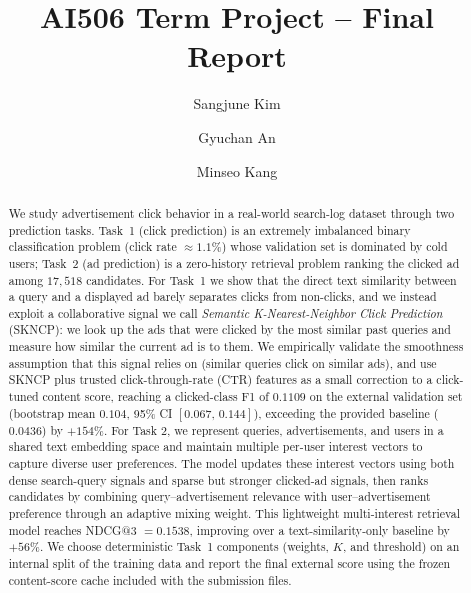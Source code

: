 \documentclass[sigconf, nonacm]{acmart}
\begin{document}
\newcommand{\bit}{\begin{itemize}}
\newcommand{\eit}{\end{itemize}}

\title{AI506 Term Project -- Final Report}

\author{Sangjune Kim}
\author{Gyuchan An}
\author{Minseo Kang}

\begin{abstract}
We study advertisement click behavior in a real-world search-log dataset
through two prediction tasks. Task~1 (click prediction) is an extremely
imbalanced binary classification problem (click rate $\approx 1.1\%$) whose
validation set is dominated by cold users; Task~2 (ad prediction) is a
zero-history retrieval problem ranking the clicked ad among $17{,}518$
candidates. For Task~1 we show that the direct text similarity between a
query and a displayed ad barely separates clicks from non-clicks, and we
instead exploit a collaborative signal we call \emph{Semantic K-Nearest-Neighbor
Click Prediction} (SKNCP): we look up the ads that were clicked by the most
similar past queries and measure how similar the current ad is to them. We
empirically validate the smoothness assumption that this signal relies on
(similar queries click on similar ads), and use SKNCP plus trusted
click-through-rate (CTR) features as a small correction to a click-tuned
content score, reaching a clicked-class F1 of $0.1109$ on the
external validation set (bootstrap mean $0.104$, 95\% CI $[0.067,\,0.144]$),
exceeding the provided baseline ($0.0436$) by $+154\%$. 
For Task 2, we represent queries, advertisements, and users in a shared text embedding space and maintain multiple per-user interest vectors to capture diverse user preferences. The model updates these interest vectors using both dense search-query signals and sparse but stronger clicked-ad signals, then ranks candidates by combining query–advertisement relevance with user–advertisement preference through an adaptive mixing weight.
This lightweight multi-interest retrieval model reaches NDCG@3 $=0.1538$, improving over a text-similarity-only baseline by
$+56\%$. We choose deterministic Task~1 components (weights, $K$, and threshold)
on an internal split of the training data and report the final external score
using the frozen content-score cache included with the submission files.
\end{abstract}
\maketitle
\end{document}
